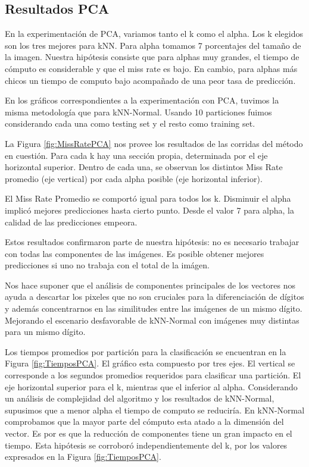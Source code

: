 \documentclass{article}
\begin{document}
\subsection*{Resultados PCA}

En la experimentación de PCA, variamos tanto el k como el alpha. Los k elegidos son los tres mejores para kNN. Para alpha tomamos 7 porcentajes del tamaño de la imagen. Nuestra hipótesis consiste que para alphas muy grandes, el tiempo de cómputo es considerable y que el miss rate es bajo. En cambio, para alphas más chicos un tiempo de computo bajo acompañado de una peor tasa de predicción. 

En los gráficos correspondientes a la experimentación con PCA, tuvimos la misma metodología que para kNN-Normal. Usando 10 particiones fuimos considerando cada una como testing set y el resto como training set.

La Figura \ref{fig:MissRatePCA} nos provee los resultados de las corridas del método en cuestión. Para cada k hay una sección propia, determinada por el eje horizontal superior. Dentro de cada una, se observan los distintos Miss Rate promedio (eje vertical) por cada alpha posible (eje horizontal inferior). 

El Miss Rate Promedio se comportó igual para todos los k. Disminuir el alpha implicó mejores predicciones hasta cierto punto. Desde el valor 7 para alpha, la calidad de las predicciones empeora. 

Estos resultados confirmaron parte de nuestra hipótesis: no es necesario trabajar con todas las componentes de las imágenes. Es posible obtener mejores predicciones si uno no trabaja con el total de la imágen. 

Nos hace suponer que el análisis de componentes principales de los vectores nos ayuda a descartar los pixeles que no son cruciales para la diferenciación de dígitos y además concentrarnos en las similitudes entre las imágenes de un mismo dígito. Mejorando el escenario desfavorable de kNN-Normal con imágenes muy distintas para un mismo dígito.


Los tiempos promedios por partición para la clasificación se encuentran en la Figura \ref{fig:TiemposPCA}. El gráfico esta compuesto por tres ejes. El vertical se corresponde a los segundos promedios requeridos para clasificar una partición. El eje horizontal superior para el k, mientras que el inferior al alpha. 
Considerando un análisis de complejidad del algoritmo y los resultados de kNN-Normal, supusimos que a menor alpha el tiempo de computo se reduciría. En kNN-Normal comprobamos que la mayor parte del cómputo esta atado a la dimensión del vector. Es por es que la reducción de componentes tiene un gran impacto en el tiempo. Esta hipótesis se corroboró independientemente del k, por los valores expresados en la Figura \ref{fig:TiemposPCA}.
\end{document}
